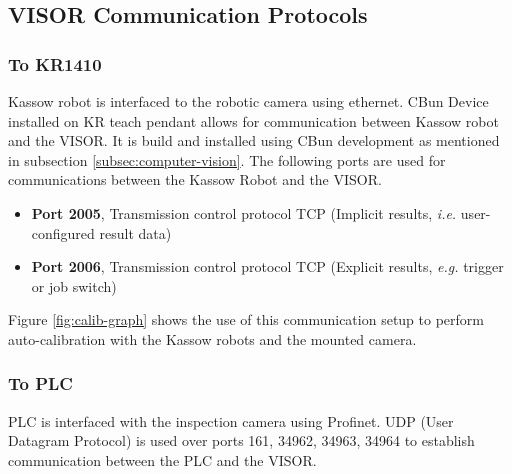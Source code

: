 \subsection{VISOR Communication Protocols}
\subsubsection{To KR1410}
Kassow robot is interfaced to the robotic camera using ethernet.
CBun Device installed on KR teach pendant allows for communication between
Kassow robot and the VISOR. It is build and installed using CBun development as mentioned in subsection \ref{subsec:computer-vision}. The following ports are used for communications between the Kassow Robot and the VISOR. 

\begin{itemize}
  \item \textbf{Port 2005}, Transmission control protocol TCP (Implicit results, \textit{i.e.} user-configured result data)
  \item \textbf{Port 2006}, Transmission control protocol TCP (Explicit results, \textit{e.g.} trigger or job switch)
\end{itemize}

Figure \ref{fig:calib-graph} shows the use of this communication setup to perform auto-calibration with the Kassow robots and the mounted camera.

\subsubsection{To PLC}
PLC is interfaced with the inspection camera using Profinet.
UDP (User Datagram Protocol) is used over ports 161, 34962, 34963, 34964 to establish communication between the PLC and the VISOR.






